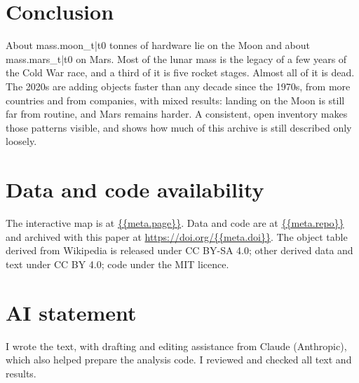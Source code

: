 \documentclass[11pt,a4paper]{article}
\begin{document}
\section{Conclusion}
About {{mass.moon_t|t0}} tonnes of hardware lie on the Moon and about {{mass.mars_t|t0}} on Mars. Most of the lunar mass is the legacy of a few years of the Cold War race, and a third of it is five rocket stages. Almost all of it is dead. The 2020s are adding objects faster than any decade since the 1970s, from more countries and from companies, with mixed results: landing on the Moon is still far from routine, and Mars remains harder. A consistent, open inventory makes those patterns visible, and shows how much of this archive is still described only loosely.

\section*{Data and code availability}
The interactive map is at \url{{{meta.page}}}. Data and code are at \url{{{meta.repo}}} and archived with this paper at \url{https://doi.org/{{meta.doi}}}. The object table derived from Wikipedia is released under CC BY-SA 4.0; other derived data and text under CC BY 4.0; code under the MIT licence.

\section*{AI statement}
I wrote the text, with drafting and editing assistance from Claude (Anthropic), which also helped prepare the analysis code. I reviewed and checked all text and results.
\end{document}
